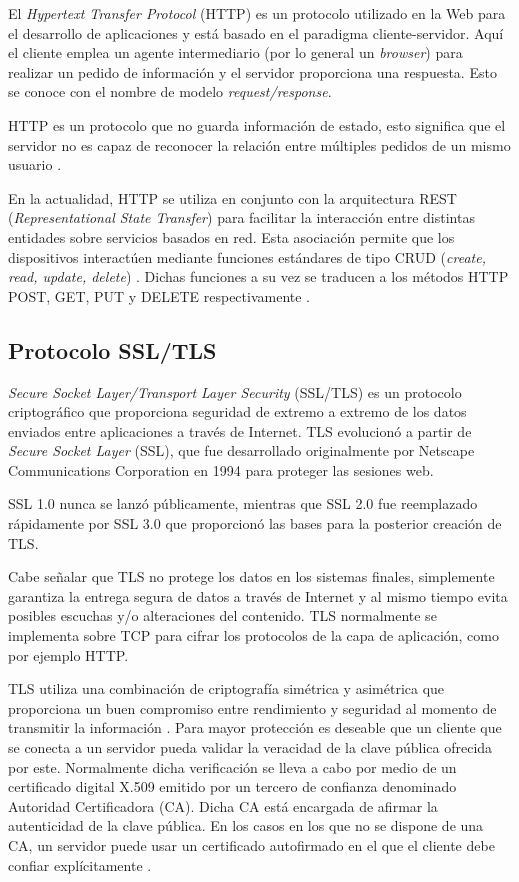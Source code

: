 El \textit{Hypertext Transfer Protocol} (HTTP)\citep{http:1} es un protocolo utilizado en la Web para el desarrollo de aplicaciones y está basado en el paradigma cliente-servidor. Aquí el cliente emplea un agente intermediario (por lo general un \textit{browser}) para realizar un pedido de información y el servidor proporciona una respuesta. Esto se conoce con el nombre de modelo \textit{request/response}.

HTTP es un protocolo que no guarda información de estado, esto significa que el servidor no es capaz de reconocer la relación entre múltiples pedidos de un mismo usuario  \citep{oreilly:1}.

En la actualidad, HTTP se utiliza en conjunto con la arquitectura REST (\textit{Representational State Transfer}) \citep{rest} para facilitar la interacción entre distintas entidades sobre servicios basados en red. Esta asociación permite que los dispositivos interactúen mediante funciones estándares de tipo CRUD (\textit{create, read, update, delete})  \citep{10.1145/3292674}. Dichas funciones a su vez se traducen a los métodos HTTP POST, GET, PUT y DELETE respectivamente \citep{GLAROUDIS2020107037}. 

\subsection{Protocolo SSL/TLS}
\label{sec:Protocolo SSL/TLS}
\textit{Secure Socket Layer/Transport Layer Security} (SSL/TLS) \citep{tls:1} es un protocolo criptográfico que proporciona seguridad de extremo a extremo de los datos enviados entre aplicaciones a través de Internet.
TLS evolucionó a partir de \textit{Secure Socket Layer} (SSL), que fue desarrollado originalmente por Netscape Communications Corporation en 1994 para proteger las sesiones web. 

SSL 1.0 nunca se lanzó públicamente, mientras que SSL 2.0 fue reemplazado rápidamente por SSL 3.0 que proporcionó las bases para la posterior creación de TLS. 

Cabe señalar que TLS no protege los datos en los sistemas finales, simplemente garantiza la entrega segura de datos a través de Internet y al mismo tiempo evita posibles escuchas y/o alteraciones del contenido.
TLS normalmente se implementa sobre TCP \citep{rfc793} para cifrar los protocolos de la capa de aplicación, como por ejemplo HTTP.

TLS utiliza una combinación de criptografía simétrica y asimétrica que proporciona un buen compromiso entre rendimiento y seguridad al momento de transmitir la información \citep{tls:2}. Para mayor protección es deseable que un cliente que se conecta a un servidor pueda validar la veracidad de la clave pública ofrecida por este. Normalmente dicha verificación se lleva a cabo por medio de un certificado digital X.509 \citep{x509:1} emitido por un tercero de confianza denominado Autoridad Certificadora (CA). Dicha CA está encargada de  afirmar la autenticidad de la clave pública. En los casos en los que no se dispone de una CA, un servidor puede usar un certificado autofirmado en el que el cliente debe confiar explícitamente \citep{tls:2}.


